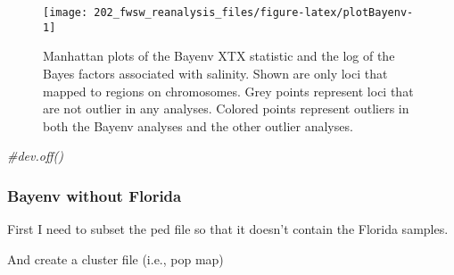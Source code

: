 \documentclass[11pt,]{article}
\newenvironment{Shaded}{\begin{snugshade}}{\end{snugshade}}
\newcommand{\KeywordTok}[1]{\textcolor[rgb]{0.13,0.29,0.53}{\textbf{#1}}}
\newcommand{\DataTypeTok}[1]{\textcolor[rgb]{0.13,0.29,0.53}{#1}}
\newcommand{\CharTok}[1]{\textcolor[rgb]{0.31,0.60,0.02}{#1}}
\newcommand{\StringTok}[1]{\textcolor[rgb]{0.31,0.60,0.02}{#1}}
\newcommand{\CommentTok}[1]{\textcolor[rgb]{0.56,0.35,0.01}{\textit{#1}}}
\newcommand{\OtherTok}[1]{\textcolor[rgb]{0.56,0.35,0.01}{#1}}
\newcommand{\OperatorTok}[1]{\textcolor[rgb]{0.81,0.36,0.00}{\textbf{#1}}}
\newcommand{\NormalTok}[1]{#1}
\begin{document}
\begin{figure}[H]
\texttt{[image: 202\_fwsw\_reanalysis\_files/figure-latex/plotBayenv-1]} \caption{Manhattan plots of the Bayenv XTX statistic and the log of the Bayes factors associated with salinity. Shown are only loci that mapped to regions on chromosomes. Grey points represent loci that are not outlier in any analyses. Colored points represent outliers in both the Bayenv analyses and the other outlier analyses.}\label{fig:plotBayenv}
\end{figure}

\begin{Shaded}
\begin{Highlighting}[]
\CommentTok{#dev.off()}
\end{Highlighting}
\end{Shaded}

\subsubsection{Bayenv without Florida}\label{bayenv-without-florida}

First I need to subset the ped file so that it doesn't contain the
Florida samples.

\begin{Shaded}
\end{Shaded}

And create a cluster file (i.e., pop map)
\end{document}
